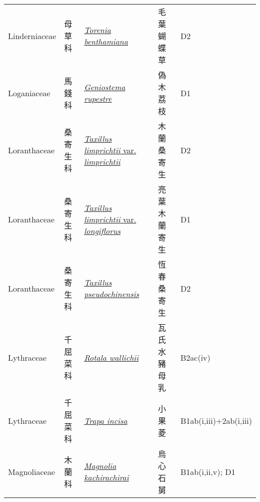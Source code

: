 {\begin{longtable}{L{2.5cm}L{2cm}L{5cm}L{2.5cm}L{3cm}}
    Linderniaceae & 母草科 & \href{http://www.theplantlist.org/tpl1.1/search?q=Torenia+benthamiana}{\textit{Torenia benthamiana} } & 毛葉蝴蝶草 & D2    \\
    Loganiaceae & 馬錢科 & \href{http://www.theplantlist.org/tpl1.1/search?q=Geniostema+rupestre}{\textit{Geniostema rupestre} } & 偽木荔枝 & D1    \\
    Loranthaceae & 桑寄生科 & \href{http://www.theplantlist.org/tpl1.1/search?q=Taxillus+limprichtii+var.+limprichtii}{\textit{Taxillus limprichtii} var. \textit{limprichtii} } & 木蘭桑寄生 & D2    \\
    Loranthaceae & 桑寄生科 & \href{http://www.theplantlist.org/tpl1.1/search?q=Taxillus+limprichtii+var.+longiflorus}{\textit{Taxillus limprichtii} var. \textit{longiflorus} } & 亮葉木蘭寄生 & D1    \\
    Loranthaceae & 桑寄生科 & \href{http://www.theplantlist.org/tpl1.1/search?q=Taxillus+pseudochinensis}{\textit{Taxillus pseudochinensis} } & 恆春桑寄生 & D2    \\
    Lythraceae & 千屈菜科 & \href{http://www.theplantlist.org/tpl1.1/search?q=Rotala+wallichii}{\textit{Rotala wallichii} } & 瓦氏水豬母乳 & B2ac(iv)    \\
    Lythraceae & 千屈菜科 & \href{http://www.theplantlist.org/tpl1.1/search?q=Trapa+incisa}{\textit{Trapa incisa} } & 小果菱 & B1ab(i,iii)+2ab(i,iii)    \\
    Magnoliaceae & 木蘭科 & \href{http://www.theplantlist.org/tpl1.1/search?q=Magnolia+kachirachirai}{\textit{Magnolia kachirachirai} } & 烏心石舅 & B1ab(i,ii,v); D1    \\

\end{longtable}}
